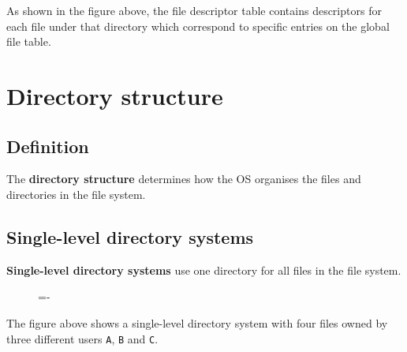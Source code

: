 \documentclass[a4paper]{systems-software}
\begin{document}
As shown in the figure above, the file descriptor table contains descriptors for each file under that directory which correspond to specific entries on the global file table.


\newpage

\section*{Directory structure}

\subsection*{Definition}

The \textbf{directory structure} determines how the OS organises the files and directories in the file system.


\subsection*{Single-level directory systems}

\textbf{Single-level directory systems} use one directory for all files in the file system.

\begin{figure}[H]
  \lineskip=-\fboxrule
\end{figure}

The figure above shows a single-level directory system with four files owned by three different users \texttt{A}, \texttt{B} and \texttt{C}.
\end{document}
